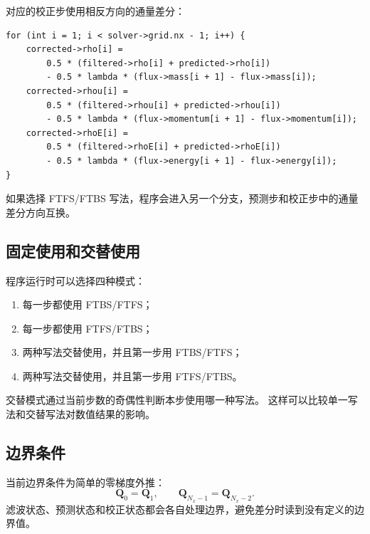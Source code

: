对应的校正步使用相反方向的通量差分：
\begin{lstlisting}
for (int i = 1; i < solver->grid.nx - 1; i++) {
    corrected->rho[i] =
        0.5 * (filtered->rho[i] + predicted->rho[i])
        - 0.5 * lambda * (flux->mass[i + 1] - flux->mass[i]);
    corrected->rhou[i] =
        0.5 * (filtered->rhou[i] + predicted->rhou[i])
        - 0.5 * lambda * (flux->momentum[i + 1] - flux->momentum[i]);
    corrected->rhoE[i] =
        0.5 * (filtered->rhoE[i] + predicted->rhoE[i])
        - 0.5 * lambda * (flux->energy[i + 1] - flux->energy[i]);
}
\end{lstlisting}

如果选择 FTFS/FTBS 写法，程序会进入另一个分支，预测步和校正步中的通量差分方向互换。

\subsection{固定使用和交替使用}

程序运行时可以选择四种模式：
\begin{enumerate}[label=\arabic*.]
    \item 每一步都使用 FTBS/FTFS；
    \item 每一步都使用 FTFS/FTBS；
    \item 两种写法交替使用，并且第一步用 FTBS/FTFS；
    \item 两种写法交替使用，并且第一步用 FTFS/FTBS。
\end{enumerate}

交替模式通过当前步数的奇偶性判断本步使用哪一种写法。
这样可以比较单一写法和交替写法对数值结果的影响。

\subsection{边界条件}

当前边界条件为简单的零梯度外推：
\[
\bm Q_0=\bm Q_1,\qquad
\bm Q_{N_x-1}=\bm Q_{N_x-2}.
\]
滤波状态、预测状态和校正状态都会各自处理边界，避免差分时读到没有定义的边界值。
